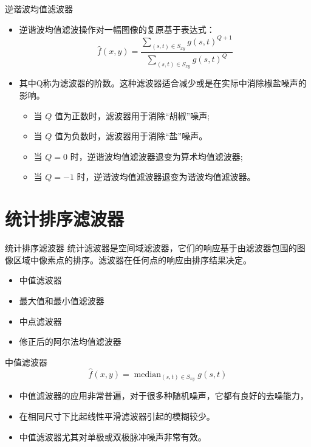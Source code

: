 \documentclass[presentation]{beamer}
\DeclareMathOperator*{\median}{median}
\begin{document}
\begin{frame}[label={sec:orgb87d0b7}]{逆谐波均值滤波器}
\begin{itemize}
\item 逆谐波均值滤波操作对一幅图像的复原基于表达式：
\[ \hat f(x,y) = \frac{\sum_{(s,t)\in S_{xy}}g(s,t)^{Q+1}}{\sum_{(s,t)\in S_{xy}}g(s,t)^Q} \]
\item 其中Q称为滤波器的阶数。这种滤波器适合减少或是在实际中消除椒盐噪声的影响。
\begin{itemize}
\item 当 \(Q\) 值为正数时，滤波器用于消除“胡椒”噪声;
\item 当 \(Q\) 值为负数时，滤波器用于消除“盐”噪声。
\item 当 \(Q=0\) 时，逆谐波均值滤波器退变为算术均值滤波器;
\item 当 \(Q=-1\) 时，逆谐波均值滤波器退变为谐波均值滤波器。
\end{itemize}
\end{itemize}
\end{frame}

\section{统计排序滤波器}
\label{sec:org2fb44a1}
\begin{frame}[label={sec:org07e1dc3}]{统计排序滤波器}
统计滤波器是空间域滤波器，它们的响应基于由滤波器包围的图像区域中像素点的排序。滤波器在任何点的响应由排序结果决定。

\begin{itemize}
\item 中值滤波器
\item 最大值和最小值滤波器
\item 中点滤波器
\item 修正后的阿尔法均值滤波器
\end{itemize}
\end{frame}

\begin{frame}[label={sec:orgffe4db4}]{中值滤波器}
\[  \hat f(x,y) = \median_{(s,t)\in S_{xy}} g(s,t) \]

\begin{itemize}
\item 中值滤波器的应用非常普遍，对于很多种随机噪声，它都有良好的去噪能力，
\item 在相同尺寸下比起线性平滑滤波器引起的模糊较少。
\item 中值滤波器尤其对单极或双极脉冲噪声非常有效。
\end{itemize}
\end{frame}
\end{document}
